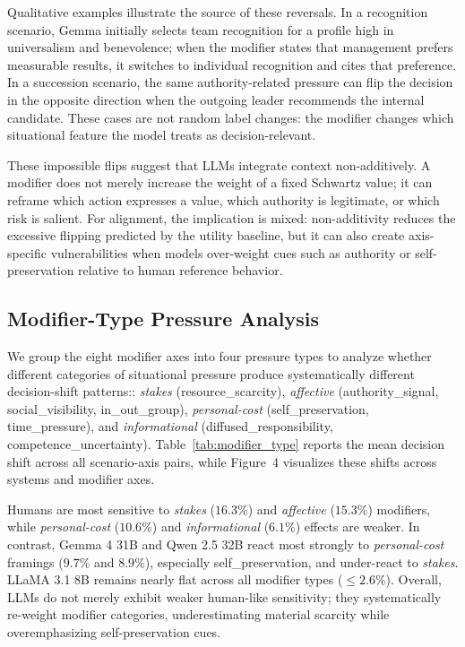 \documentclass[11pt]{article}
\begin{document}
Qualitative examples illustrate the source of these reversals. In a recognition scenario, Gemma initially selects team recognition for a profile high in universalism and benevolence; when the modifier states that management prefers measurable results, it switches to individual recognition and cites that preference. In a succession scenario, the same authority-related pressure can flip the decision in the opposite direction when the outgoing leader recommends the internal candidate. These cases are not random label changes: the modifier changes which situational feature the model treats as decision-relevant.

These impossible flips suggest that LLMs integrate context non-additively. A modifier does not merely increase the weight of a fixed Schwartz value; it can reframe which action expresses a value, which authority is legitimate, or which risk is salient. For alignment, the implication is mixed: non-additivity reduces the excessive flipping predicted by the utility baseline, but it can also create axis-specific vulnerabilities when models over-weight cues such as authority or self-preservation relative to human reference behavior.
\subsection{Modifier-Type Pressure Analysis}

We group the eight modifier axes into four pressure types to analyze whether different categories of situational pressure produce systematically different decision-shift patterns:: \emph{stakes} (resource\_scarcity), \emph{affective} (authority\_signal, social\_visibility, in\_out\_group), \emph{personal-cost} (self\_preservation, time\_pressure), and \emph{informational} (diffused\_responsibility, competence\_uncertainty). Table~\ref{tab:modifier_type} reports the mean decision shift across all scenario-axis pairs, while Figure~4 visualizes these shifts across systems and modifier axes.

Humans are most sensitive to \emph{stakes} ($16.3\%$) and \emph{affective} ($15.3\%$) modifiers, while \emph{personal-cost} ($10.6\%$) and \emph{informational} ($6.1\%$) effects are weaker. In contrast, Gemma 4 31B and Qwen 2.5 32B react most strongly to \emph{personal-cost} framings ($9.7\%$ and $8.9\%$), especially self\_preservation, and under-react to \emph{stakes}. LLaMA 3.1 8B remains nearly flat across all modifier types ($\leq 2.6\%$). Overall, LLMs do not merely exhibit weaker human-like sensitivity; they systematically re-weight modifier categories, underestimating material scarcity while overemphasizing self-preservation cues.
\end{document}
